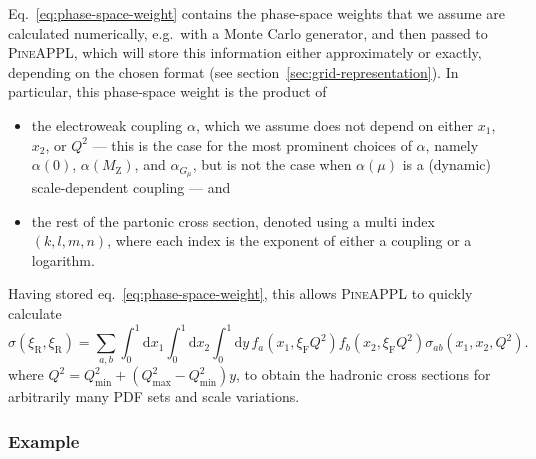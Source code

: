 Eq.~\eqref{eq:phase-space-weight} contains the phase-space weights that we assume are calculated numerically, e.g.\ with a Monte Carlo generator, and then passed to \textsc{PineAPPL}, which will store this information either approximately or exactly, depending on the chosen format (see section~\ref{sec:grid-representation}).
In particular, this phase-space weight is the product of
\begin{itemize}
\item the electroweak coupling $\alpha$, which we assume does not depend on either $x_1$, $x_2$, or $Q^2$ --- this is the case for the most prominent choices of $\alpha$, namely $\alpha (0)$, $\alpha (M_\mathrm{Z})$, and $\alpha_{G_\mu}$, but is not the case when $\alpha (\mu)$ is a (dynamic) scale-dependent coupling --- and
\item the rest of the partonic cross section, denoted using a multi index $(k,l,m,n)$, where each index is the exponent of either a coupling or a logarithm.
\end{itemize}
Having stored eq.~\eqref{eq:phase-space-weight}, this allows \textsc{PineAPPL} to quickly calculate
\begin{equation}
\sigma (\xi_\mathrm{R}, \xi_\mathrm{R}) = \sum_{a,b} \int_0^1 \mathrm{d} x_1 \int_0^1 \mathrm{d} x_2 \int_0^1 \mathrm{d} y \, f_a (x_1, \xi_\mathrm{F} Q^2) f_b (x_2, \xi_\mathrm{F} Q^2) \sigma_{ab} (x_1, x_2, Q^2) \text{.}
\label{eq:pineappl-convolution}
\end{equation}
where $Q^2 = Q^2_\mathrm{min} + (Q^2_\mathrm{max} - Q^2_\mathrm{min}) y$, to obtain the hadronic cross sections for arbitrarily many PDF sets and scale variations.

\subsubsection{Example}
\label{sec:pineappl-example}

